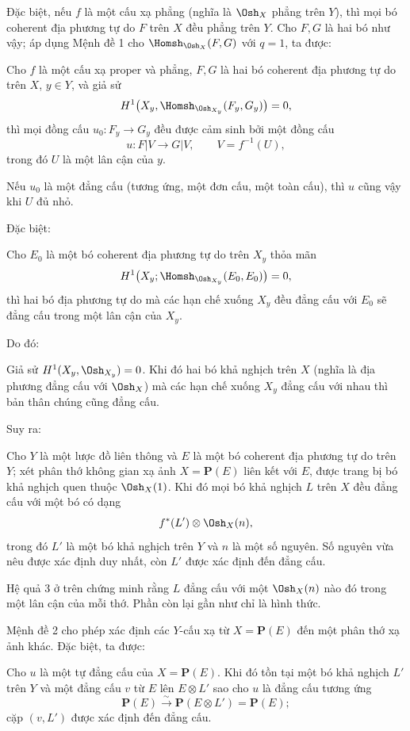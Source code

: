 Đặc biệt, nếu $f$ là một cấu xạ phẳng (nghĩa là $\Osh_X$ phẳng trên $Y$), thì
mọi bó coherent địa phương tự do $F$ trên $X$ đều phẳng trên $Y$. Cho $F,G$ là
hai bó như vậy; áp dụng Mệnh đề 1 cho $\Homsh_{\Osh_X}(F,G)$ với $q=1$, ta
được:

 Cho $f$ là một cấu xạ proper và phẳng, $F,G$ là hai bó
coherent địa phương tự do trên $X$, $y\in Y$, và giả sử
\[
  H^1\bigl(X_y,\Homsh_{\Osh_{X_y}}(F_y,G_y)\bigr)=0,
\]
thì mọi đồng cấu $u_0:F_y\longrightarrow G_y$ đều được cảm sinh bởi một đồng
cấu
\[
  u:F|V\longrightarrow G|V,
  \qquad V=f^{-1}(U),
\]
trong đó $U$ là một lân cận của $y$.

 Nếu $u_0$ là một đẳng cấu (tương ứng, một đơn cấu, một toàn
cấu), thì $u$ cũng vậy khi $U$ đủ nhỏ.

Đặc biệt:

 Cho $E_0$ là một bó coherent địa phương tự do trên $X_y$
thỏa mãn
\[
  H^1\bigl(X_y;\Homsh_{\Osh_{X_y}}(E_0,E_0)\bigr)=0,
\]
thì hai bó địa phương tự do mà các hạn chế xuống $X_y$ đều đẳng cấu
với $E_0$ sẽ đẳng cấu trong một lân cận của $X_y$.

Do đó:

 Giả sử $H^1(X_y,\Osh_{X_y})=0$. Khi đó hai bó khả nghịch
trên $X$ (nghĩa là địa phương đẳng cấu với $\Osh_X$) mà các hạn chế xuống
$X_y$ đẳng cấu với nhau thì bản thân chúng cũng đẳng cấu.

Suy ra:

 Cho $Y$ là một lược đồ liên thông và $E$ là một bó
coherent địa phương tự do trên $Y$; xét phân thớ không gian xạ ảnh
$X=\mathbf P(E)$ liên kết với $E$, được trang bị bó khả nghịch quen thuộc
$\Osh_X(1)$. Khi đó mọi bó khả nghịch $L$ trên $X$ đều đẳng cấu với một bó có
dạng
\[
  f^*(L')\otimes\Osh_X(n),
\]
trong đó $L'$ là một bó khả nghịch trên $Y$ và $n$ là một số nguyên. Số nguyên
vừa nêu được xác định duy nhất, còn $L'$ được xác định đến đẳng cấu.

Hệ quả 3 ở trên chứng minh rằng $L$ đẳng cấu với một $\Osh_X(n)$ nào đó trong
một lân cận của mỗi thớ. Phần còn lại gần như chỉ là hình thức.

Mệnh đề 2 cho phép xác định các $Y$-cấu xạ từ $X=\mathbf P(E)$ đến một phân
thớ xạ ảnh khác. Đặc biệt, ta được:

 Cho $u$ là một tự đẳng cấu của $X=\mathbf P(E)$. Khi đó tồn
tại một bó khả nghịch $L'$ trên $Y$ và một đẳng cấu $v$ từ $E$ lên
$E\otimes L'$ sao cho $u$ là đẳng cấu tương ứng
\[
  \mathbf P(E)\xrightarrow{\sim}\mathbf P(E\otimes L')=\mathbf P(E);
\]
cặp $(v,L')$ được xác định đến đẳng cấu.

